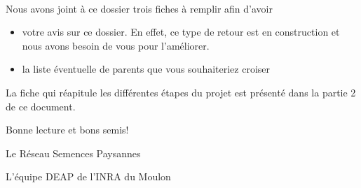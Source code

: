 ~\\ 

Nous avons joint à ce dossier trois fiches à remplir afin d'avoir 
\begin{itemize}
\item votre avis sur ce dossier. En effet, ce type de retour est en construction et nous avons besoin de vous pour l'améliorer.
\item la liste éventuelle de parents que vous souhaiteriez croiser
\end{itemize}


La fiche  qui réapitule les différentes étapes du projet est présenté dans la partie 2 de ce document.

\vfill

\begin{flushright}
Bonne lecture et bons semis!

Le Réseau Semences Paysannes

L'équipe DEAP de l'INRA du Moulon
\end{flushright}
\vfill


\newpage

